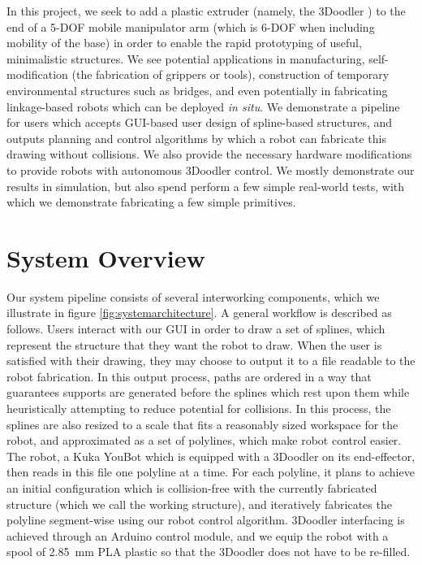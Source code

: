 \documentclass[conference]{acmsiggraph}
\begin{document}
In this project, we seek to add a plastic extruder (namely, the 3Doodler \cite{3doodler}) to the end of a 5-DOF mobile manipulator arm (which is 6-DOF when including mobility of the base) in order to enable the rapid prototyping of useful, minimalistic structures.  We see potential applications in manufacturing, self-modification (the fabrication of grippers or tools), construction of temporary environmental structures such as bridges, and even potentially in fabricating linkage-based robots which can be deployed \emph{in situ}.  We demonstrate a pipeline for users which accepts GUI-based user design of spline-based structures, and outputs planning and control algorithms by which a robot can fabricate this drawing without collisions.  We also provide the necessary hardware modifications to provide robots with autonomous 3Doodler control.  We mostly demonstrate our results in simulation, but also spend perform a few simple real-world tests, with which we demonstrate fabricating a few simple primitives.

\section{System Overview}
Our system pipeline consists of several interworking components, which we illustrate in figure \ref{fig:systemarchitecture}.  A general workflow is described as follows.  Users interact with our GUI in order to draw a set of splines, which represent the structure that they want the robot to draw.  When the user is satisfied with their drawing, they may choose to output it to a file readable to the robot fabrication.  In this output process, paths are ordered in a way that guarantees supports are generated before the splines which rest upon them while heuristically attempting to reduce potential for collisions.  In this process, the splines are also resized to a scale that fits a reasonably sized workspace for the robot, and approximated as a set of polylines, which make robot control easier.  The robot, a Kuka YouBot \cite{YouBot} which is equipped with a 3Doodler on its end-effector, then reads in this file one polyline at a time.  For each polyline, it plans to achieve an initial configuration which is collision-free with the currently fabricated structure (which we call the working structure), and iteratively fabricates the polyline segment-wise using our robot control algorithm.  3Doodler interfacing is achieved through an Arduino control module, and we equip the robot with a spool of 2.85~mm PLA plastic so that the 3Doodler does not have to be re-filled.
\end{document}
